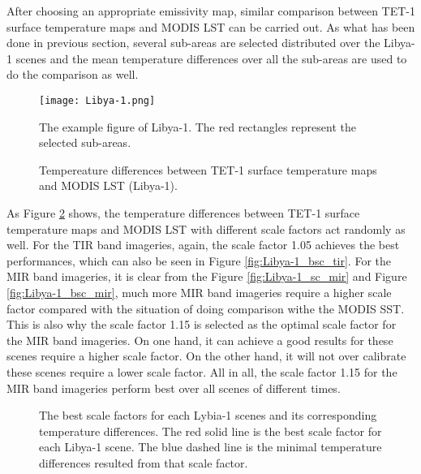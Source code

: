 \noindent After choosing an appropriate emissivity map, similar comparison between TET-1 surface temperature maps and MODIS LST can be carried out. As what has been done in previous section, several sub-areas are selected distributed over the Libya-1 scenes and the mean temperature differences over all the sub-areas are used to do the comparison as well.\\

\begin{figure}[!htbp]
\centering
\texttt{[image: Libya-1.png]}
\caption{The example figure of Libya-1. The red rectangles represent the selected sub-areas.}
\label{fig:Libya1_sub_areas}
\end{figure}

\begin{figure}[!htbp]
\centering
{}
\hspace{0.5in}
\caption{Tempereature differences between TET-1 surface temperature maps and MODIS LST (Libya-1).}
\label{fig:Libya-1_sc_mir_tir}
\end{figure}

\noindent As Figure \ref{fig:Libya-1_sc_mir_tir} shows, the temperature differences between TET-1 surface temperature maps and MODIS LST with different scale factors act randomly as well. For the TIR band imageries, again, the scale factor 1.05 achieves the best performances, which can also be seen in Figure \ref{fig:Libya-1_bsc_tir}. For the MIR band imageries, it is clear from the Figure \ref{fig:Libya-1_sc_mir} and Figure \ref{fig:Libya-1_bsc_mir}, much more MIR band imageries require a higher scale factor compared with the situation of doing comparison withe the MODIS SST. This is also why the scale factor 1.15 is selected as the optimal scale factor for the MIR band imageries. On one hand, it can achieve a good results for these scenes require a higher scale factor. On the other hand, it will not over calibrate these scenes require a lower scale factor. All in all, the scale factor 1.15 for the MIR band imageries perform best over all scenes of different times.\\

\begin{figure}[!htbp]
\centering
{}
\hspace{0.5in}
\caption{The best scale factors for each Lybia-1 scenes and its corresponding temperature differences. The red solid line is the best scale factor for each Libya-1 scene. The blue dashed line is the minimal temperature differences resulted from that scale factor.}
\label{fig:Libya-1_bsc_mir_tir}
\end{figure}

